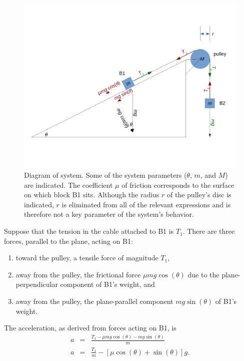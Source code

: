 \documentclass[twocolumn]{article}
\begin{document}
\begin{figure}
   \includegraphics[width=0.95\columnwidth]{diagram}
   \caption{Diagram of system. Some of the system parameters ($\theta$, $m$,
   and $M$) are indicated. The coefficient $\mu$ of friction corresponds to the
   surface on which block B1 sits. Although the radius $r$ of the pulley's disc
   is indicated, $r$ is eliminated from all of the relevant expressions and is
   therefore not a key parameter of the system's behavior.}
   \label{fig:diagram}
\end{figure}

Suppose that the tension in the cable attached to B1 is $T_1$. There are three
forces, parallel to the plane, acting on B1:
\begin{enumerate}
      \item toward the pulley, a tensile force of magnitude $T_1$,
      \item away from the pulley, the frictional force $\mu m g \cos(\theta)$
         due to the plane-perpendicular component of B1's weight, and
      \item away from the pulley, the plane-parallel component $m g
         \sin(\theta)$ of B1's weight.
\end{enumerate}
The acceleration, as derived from forces acting on B1, is
\begin{eqnarray}
   \nonumber
   a &=& \frac{T_1 - \mu m g \cos(\theta) - m g \sin(\theta)}{m}\\
   a &=& \tfrac{T_1}{m} - [\mu \cos(\theta) + \sin(\theta)] g.
   \label{eq:B1}
\end{eqnarray}
\end{document}

